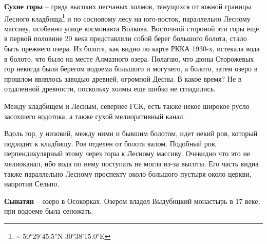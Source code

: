 

\textbf{Сухие горы} – гряда высоких песчаных холмов, тянущихся от южной границы Лесного кладбища\footnote{\textasciitilde{} 50°29'45.5"N 30°38'15.0"E} и по сосновому лесу на юго-восток, параллельно Лесному массиву, особенно улице космонавта Волкова. Восточной стороной эти горы еще в первой половине 20 века представляли собой берег большого болота, стало быть прежнего озера. Из болота, как видно по карте РККА 1930-х, истекала вода в болото, что было на месте Алмазного озера. Полагаю, что дюны Сторожевых гор некогда были берегом водоема большого и могучего, а болото, затем озеро в прошлом являлось заводью древней, огромной Десны. В какое время? Не в отдаленной древности, поскольку холмы еще шибко не сгладились.

Между кладбищем и Лесным, севернее ГСК, есть также некое широкое русло засохшего водотока, а также сухой мелиоративный канал. 

Вдоль гор, у низовий, между ними и бывшим болотом, идет некий ров, который подходит к кладбищу. Ров отделен от болота валом. 
Подобный ров, перпендикулярный этому через горы к Лесному массиву. Очевидно что это не мелиоканал, ибо вода по нему поступать не могла из-за высоты. Его часть видна также параллельно Лесному проспекту около большого пустыря около церкви, напротив Сельпо.

\medskip
 
\textbf{Сынатян} – озеро в Осокорках. Озером владел Выдубицкий монастырь в 17 веке, при водоеме была сеножать.\\
